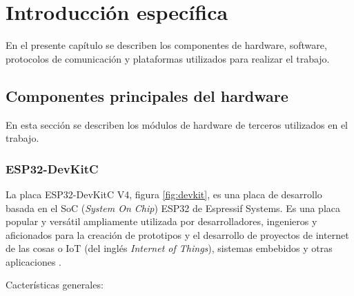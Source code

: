 \chapter{Introducción específica} %

\label{Chapter2}

En el presente capítulo se describen los componentes de hardware, software, protocolos de comunicación y plataformas utilizados para realizar el trabajo.

\section{Componentes principales del hardware}
\label{sec:hw:components}

En esta sección se describen los módulos de hardware de terceros utilizados en el trabajo.

\subsection{ESP32-DevKitC}

La placa ESP32-DevKitC V4, figura \ref{fig:devkit}, es una placa de desarrollo basada en el SoC (\textit{System On Chip}) ESP32 de Espressif Systems. Es una placa popular y versátil ampliamente utilizada por desarrolladores, ingenieros y aficionados para la creación de prototipos y el desarrollo de proyectos de internet de las cosas o IoT (del inglés \textit{Internet of Things}), sistemas embebidos y otras aplicaciones \cite{DEV:KIT}.

Cacterísticas generales:

